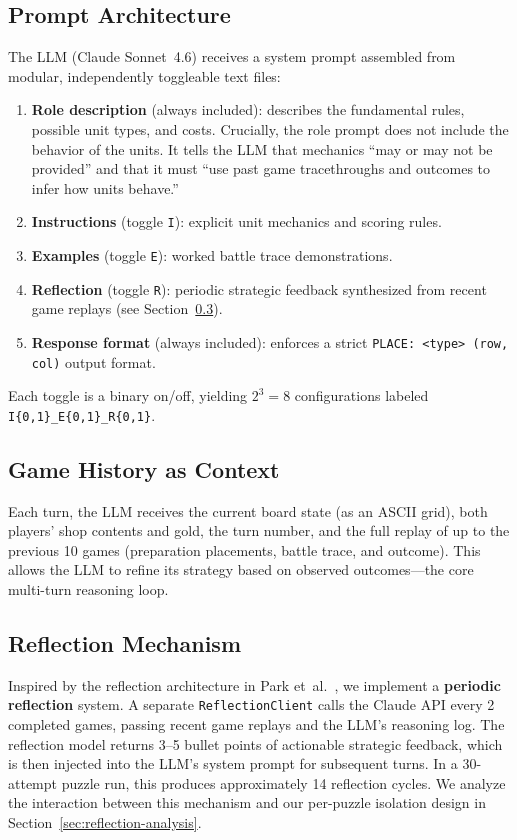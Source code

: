 \documentclass[11pt]{article}
\begin{document}
\subsection{Prompt Architecture}

The LLM (Claude Sonnet~4.6) receives a system prompt assembled from modular, independently toggleable text files:

\begin{enumerate}[nosep]
    \item \textbf{Role description} (always included): describes the fundamental rules, possible unit types, and costs. Crucially, the role prompt does not include the behavior of the units. It tells the LLM that mechanics ``may or may not be provided'' and that it must ``use past game tracethroughs and outcomes to infer how units behave.''
    \item \textbf{Instructions} (toggle \texttt{I}): explicit unit mechanics and scoring rules.
    \item \textbf{Examples} (toggle \texttt{E}): worked battle trace demonstrations.
    \item \textbf{Reflection} (toggle \texttt{R}): periodic strategic feedback synthesized from recent game replays (see Section~\ref{sec:reflection}).
    \item \textbf{Response format} (always included): enforces a strict \texttt{PLACE: <type> (row, col)} output format.
\end{enumerate}

Each toggle is a binary on/off, yielding $2^3 = 8$ configurations labeled \texttt{I\{0,1\}\_E\{0,1\}\_R\{0,1\}}.

\subsection{Game History as Context}

Each turn, the LLM receives the current board state (as an ASCII grid), both players' shop contents and gold, the turn number, and the full replay of up to the previous 10 games (preparation placements, battle trace, and outcome).
This allows the LLM to refine its strategy based on observed outcomes---the core multi-turn reasoning loop.

\subsection{Reflection Mechanism}\label{sec:reflection}

Inspired by the reflection architecture in Park et~al.~\cite{park2023generative}, we implement a \textbf{periodic reflection} system.
A separate \texttt{ReflectionClient} calls the Claude API every 2 completed games, passing recent game replays and the LLM's reasoning log.
The reflection model returns 3--5 bullet points of actionable strategic feedback, which is then injected into the LLM's system prompt for subsequent turns.
In a 30-attempt puzzle run, this produces approximately 14 reflection cycles.
We analyze the interaction between this mechanism and our per-puzzle isolation design in Section~\ref{sec:reflection-analysis}.
\end{document}
